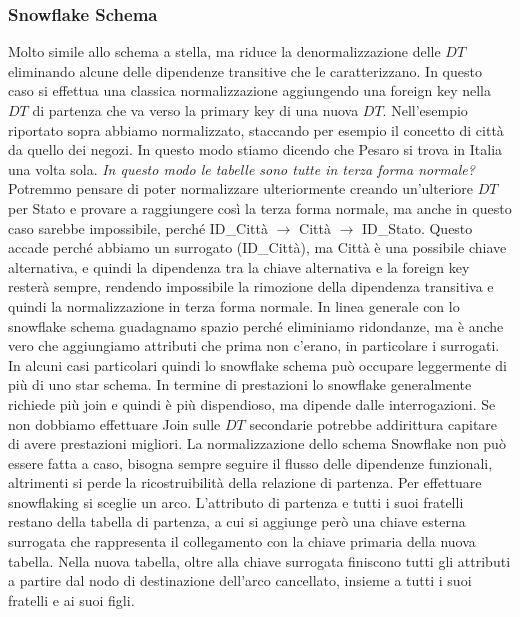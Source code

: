 \subsubsection{Snowflake Schema}
Molto simile allo schema a stella, ma riduce la denormalizzazione delle $DT$ eliminando alcune delle dipendenze transitive che le caratterizzano. In questo caso si effettua una classica normalizzazione aggiungendo una foreign key nella $DT$ di partenza che va verso la primary key di una nuova $DT$.
\noindent Nell'esempio riportato sopra abbiamo normalizzato, staccando per esempio il concetto di città da quello dei negozi. In questo modo stiamo dicendo che Pesaro si trova in Italia una volta sola.\newline
\textit{In questo modo le tabelle sono tutte in terza forma normale?}\newline
Potremmo pensare di poter normalizzare ulteriormente creando un'ulteriore $DT$ per Stato e provare a raggiungere così la terza forma normale, ma anche in questo caso sarebbe impossibile, perché ID\_Città $\xrightarrow{}$ Città $\xrightarrow{}$ ID\_Stato. Questo accade perché abbiamo un surrogato (ID\_Città), ma Città è una possibile chiave alternativa, e quindi la dipendenza tra la chiave alternativa e la foreign key resterà sempre, rendendo impossibile la rimozione della dipendenza transitiva e quindi la normalizzazione in terza forma normale.\newline
In linea generale con lo snowflake schema guadagnamo spazio perché eliminiamo ridondanze, ma è anche vero che aggiungiamo attributi che prima non c'erano, in particolare i surrogati. In alcuni casi particolari quindi lo snowflake schema può occupare leggermente di più di uno star schema.\newline
In termine di prestazioni lo snowflake generalmente richiede più join e quindi è più dispendioso, ma dipende dalle interrogazioni. Se non dobbiamo effettuare Join sulle $DT$ secondarie potrebbe addirittura capitare di avere prestazioni migliori.\newline\newline
La normalizzazione dello schema Snowflake non può essere fatta a caso, bisogna sempre seguire il flusso delle dipendenze funzionali, altrimenti si perde la ricostruibilità della relazione di partenza.
\noindent Per effettuare snowflaking si sceglie un arco. L'attributo di partenza e tutti i suoi fratelli restano della tabella di partenza, a cui si aggiunge però una chiave esterna surrogata che rappresenta il collegamento con la chiave primaria della nuova tabella.\newline
Nella nuova tabella, oltre alla chiave surrogata finiscono tutti gli attributi a partire dal nodo di destinazione dell'arco cancellato, insieme a tutti i suoi fratelli e ai suoi figli.\newline
